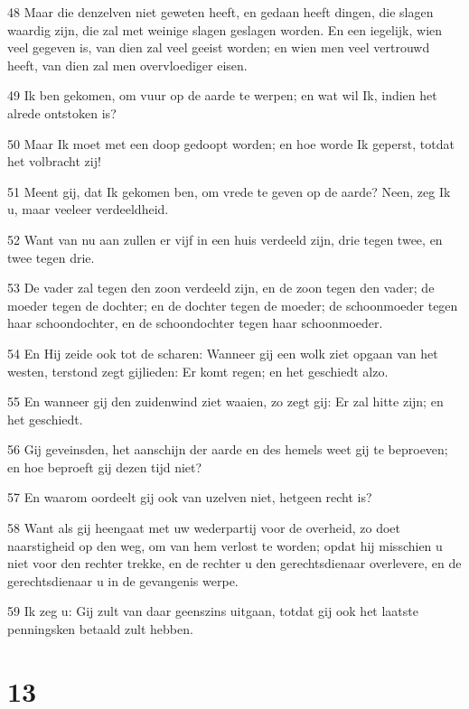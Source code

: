 \par 48 Maar die denzelven niet geweten heeft, en gedaan heeft dingen, die slagen waardig zijn, die zal met weinige slagen geslagen worden. En een iegelijk, wien veel gegeven is, van dien zal veel geeist worden; en wien men veel vertrouwd heeft, van dien zal men overvloediger eisen.
\par 49 Ik ben gekomen, om vuur op de aarde te werpen; en wat wil Ik, indien het alrede ontstoken is?
\par 50 Maar Ik moet met een doop gedoopt worden; en hoe worde Ik geperst, totdat het volbracht zij!
\par 51 Meent gij, dat Ik gekomen ben, om vrede te geven op de aarde? Neen, zeg Ik u, maar veeleer verdeeldheid.
\par 52 Want van nu aan zullen er vijf in een huis verdeeld zijn, drie tegen twee, en twee tegen drie.
\par 53 De vader zal tegen den zoon verdeeld zijn, en de zoon tegen den vader; de moeder tegen de dochter; en de dochter tegen de moeder; de schoonmoeder tegen haar schoondochter, en de schoondochter tegen haar schoonmoeder.
\par 54 En Hij zeide ook tot de scharen: Wanneer gij een wolk ziet opgaan van het westen, terstond zegt gijlieden: Er komt regen; en het geschiedt alzo.
\par 55 En wanneer gij den zuidenwind ziet waaien, zo zegt gij: Er zal hitte zijn; en het geschiedt.
\par 56 Gij geveinsden, het aanschijn der aarde en des hemels weet gij te beproeven; en hoe beproeft gij dezen tijd niet?
\par 57 En waarom oordeelt gij ook van uzelven niet, hetgeen recht is?
\par 58 Want als gij heengaat met uw wederpartij voor de overheid, zo doet naarstigheid op den weg, om van hem verlost te worden; opdat hij misschien u niet voor den rechter trekke, en de rechter u den gerechtsdienaar overlevere, en de gerechtsdienaar u in de gevangenis werpe.
\par 59 Ik zeg u: Gij zult van daar geenszins uitgaan, totdat gij ook het laatste penningsken betaald zult hebben.

\chapter{13}


